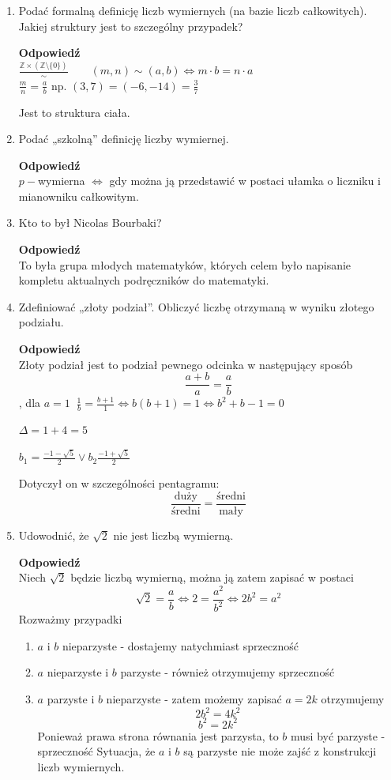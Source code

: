 \documentclass[12pt,a4paper]{article}
\theoremstyle{break}
\newcommand{\Odp}[1]{
		\begin{mdframed}[style=zadanie]
			\textbf{Odpowiedź}\\
			#1
		\end{mdframed}
	}
\begin{document}
\begin{enumerate}[1.]
	\item Podać formalną definicję liczb wymiernych (na bazie liczb całkowitych). Jakiej struktury jest to szczególny przypadek?
	\Odp{
	$\frac{\mathbb{Z}\times (\mathbb{Z}\setminus\{0\})}{\sim} \qquad (m,n)\sim (a,b) \Leftrightarrow m\cdot b=n\cdot a$\\
	$\frac{m}{n}=\frac{a}{b}$ np. $(3,7)=(-6,-14)=\frac{3}{7}$
	
	Jest to struktura ciała.
	}
	\newpage
	\item Podać „szkolną” definicję liczby wymiernej.
	\Odp{
		$p-$wymierna $\Leftrightarrow$ gdy można ją przedstawić w postaci ułamka o liczniku i mianowniku całkowitym.
	}
	
	\item Kto to był Nicolas Bourbaki?
	\Odp{
		To była grupa młodych matematyków, których celem było napisanie kompletu aktualnych podręczników do matematyki.
	}
	
	\item Zdefiniować „złoty podział”. Obliczyć liczbę otrzymaną w wyniku złotego podziału.
	\Odp{Złoty podział jest to podział pewnego odcinka w następujący sposób
	$$\frac{a+b}{a}=\frac{a}{b}$$, dla $a=1 \:$
	$\frac{1}{b}=\frac{b+1}{1}\Leftrightarrow b(b+1)=1 \Leftrightarrow b^2+b-1=0$ 
	
	$\Delta=1+4=5$ 
	
	$b_1=\frac{-1-\sqrt{5}}{2} \vee b_2\frac{-1+\sqrt{5}}{2}$
	
	Dotyczył on w szczególności pentagramu:
	$$\frac{\text{duży}}{\text{średni}}=\frac{\text{średni}}{\text{mały}}$$
	}
	
	\item Udowodnić, że $\sqrt{2}$ nie jest liczbą wymierną.
	\Odp{
		Niech $\sqrt{2}$ będzie liczbą wymierną, można ją zatem zapisać w postaci 
		$$\sqrt{2}=\frac{a}{b} \Leftrightarrow 2=\frac{a^2}{b^2} \Leftrightarrow 2b^2=a^2$$
		Rozważmy przypadki 
		\begin{enumerate}[1$^\circ$]
			\item $a$ i $b$ nieparzyste - dostajemy natychmiast sprzeczność
			\item $a$ nieparzyste i $b$ parzyste - również otrzymujemy sprzeczność
			\item $a$ parzyste i $b$ nieparzyste - zatem możemy zapisać $a=2k$ otrzymujemy
			$$2b^2=4k^2$$
			$$b^2=2k^2$$
			Ponieważ prawa strona równania jest parzysta, to $b$ musi być parzyste - sprzeczność
			Sytuacja, że $a$ i $b$ są parzyste nie może zajść z konstrukcji liczb wymiernych.
			

\end{enumerate}}
\end{enumerate}
\end{document}
